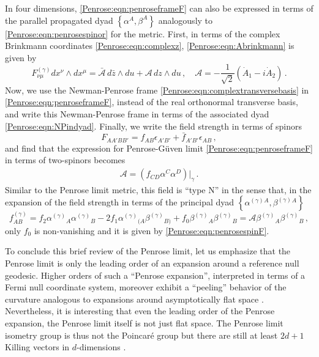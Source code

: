 In four dimensions, \eqref{Penrose:eqn:penroseframeF} can also be expressed in terms of the parallel propagated dyad  $\left\lbrace \alpha^A, \beta^A\right\rbrace$ analogously to \eqref{Penrose:eqn:penrosespinor} for the metric. First, in terms of the complex Brinkmann coordinates \eqref{Penrose:eqn:complexz},  \eqref{Penrose:eqn:Abrinkmann} is given by 
\begin{equation}
F^{(\gamma)}_{\nu \mu} dx^{\nu} \wedge dx^{\mu} =  \bar{\mathcal{A}} \,  d\bar{z} \wedge du   + \mathcal{A}  \, dz   \wedge du \, ,  \quad  \mathcal{A} = -\frac{1}{\sqrt{2}}\left(\dot{A}_1 - i \dot{A}_2\right) \, .
\end{equation}
Now, we use the Newman-Penrose frame \eqref{Penrose:eqn:complextransversebasis} in \eqref{Penrose:eqn:penroseframeF}, instead of the real orthonormal transverse basis, and write this Newman-Penrose frame in terms of the associated dyad \eqref{Penrose:eqn:NPindyad}. Finally, we write the field strength in terms of spinors
\begin{equation}
F_{AA' BB'} = f_{AB}\epsilon_{A'B'} + \bar{f}_{A'B'}\epsilon_{AB} \, ,
\end{equation}
and find that the expression for Penrose-G\"uven limit  \eqref{Penrose:eqn:penroseframeF} in terms of two-spinors becomes
\begin{equation}\label{Penrose:eqn:penrosespinF}
\begin{aligned}
\mathcal{A} =  \left(f_{CD} \alpha^C \alpha^D \right)|_{\gamma}\, .
\end{aligned}
\end{equation}
Similar to the Penrose limit metric, this field is ``type N'' in the sense that, in the expansion of the field strength in terms of the principal dyad $\left\lbrace \alpha^{(\gamma)}{}^A , \beta^{(\gamma)}{}^A\right\rbrace$
\begin{equation}
f^{(\gamma)}_{AB} = f_2  \alpha^{(\gamma)}{}_A   \alpha^{(\gamma)}{}_B - 2 f_1    \alpha^{(\gamma)}{}_{(A}  \beta^{(\gamma)}{}_{B)} + f_0 \beta^{(\gamma)}{}_A   \beta^{(\gamma)}{}_B = \mathcal{A} \beta^{(\gamma)}{}_A   \beta^{(\gamma)}{}_B\, ,
\end{equation}
only $f_0$ is non-vanishing and it is given by \eqref{Penrose:eqn:penrosespinF}.

To conclude this brief review of the Penrose limit, let us emphasize that the Penrose limit is only the leading order of an expansion around a reference null geodesic. Higher orders of such a ``Penrose expansion'', interpreted in terms of a Fermi null coordinate system, moreover exhibit a ``peeling'' behavior of the curvature analogous to expansions around asymptotically flat space \cite{Blau:2006ar}. Nevertheless, it is interesting that even the leading order of the Penrose expansion, the Penrose limit itself is not just flat space. The Penrose limit isometry group is thus not the Poincar\'e group but there are still at least $2d+1$ Killing vectors in $d$-dimensions \cite{blau2011plane}.


